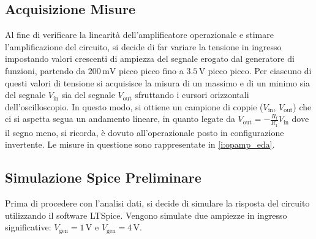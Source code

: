 \documentclass[a4paper,11pt]{article} %
\begin{document}




\subsection{Acquisizione Misure}
Al fine di verificare la linearità dell'amplificatore operazionale e stimare l'amplificazione del circuito, si decide di
far variare la tensione in ingresso impostando valori crescenti di ampiezza del segnale erogato dal generatore di
funzioni, partendo da $200\,\si{\mV}$ picco picco fino a $3.5\,\si{\V}$ picco picco. Per ciascuno di questi valori di
tensione si acquisisce la misura di un massimo e di un minimo sia del segnale $V_{\text{in}}$ sia del segnale
$V_{\text{out}}$ sfruttando i cursori orizzontali dell'oscilloscopio. In questo modo, si ottiene un campione di coppie
($V_{\text{in}}$, $V_{\text{out}}$) che ci si aspetta segua un andamento lineare, in quanto legate da
$V_{\text{out}}=-\frac{R_{\text{f}}}{R_{1}}V_{\text{in}}$ dove il segno meno, si ricorda, è dovuto all'operazionale
posto in configurazione invertente. Le misure in questione sono rappresentate in \autoref{i:opamp_eda}.



\subsection{Simulazione Spice Preliminare}\label{s:spice} Prima di procedere con l'analisi dati, si decide di simulare
la risposta del circuito utilizzando il software LTSpice. Vengono simulate due ampiezze in ingresso significative:
$V_{\text{gen}}=1\,\si{\volt}$ e $V_{\text{gen}}=4\,\si{\volt}$. 
\end{document}
